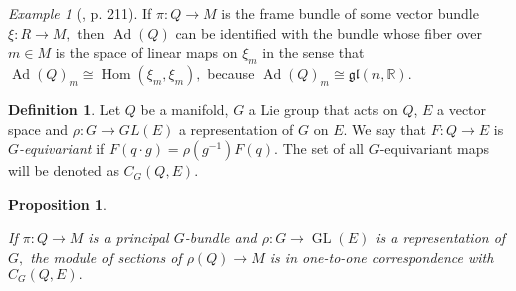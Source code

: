 \documentclass[12pt, letterpaper, reqno]{amsart}
\theoremstyle{definition}
\newtheorem{df}{Definition}
\theoremstyle{plain}
\newtheorem{prop}{Proposition}
\theoremstyle{remark}
\newtheorem{ex}{Example}
\begin{document}
\begin{ex}[\cite{montgomery2002tour}, p. 211]
	If $ \pi:Q \rightarrow M $ is the frame bundle of some vector bundle $ \xi: R \rightarrow M, $ then $ \operatorname{Ad}(Q) $ can be identified with the bundle whose fiber over $ m\in M $ is the space of linear maps on $ \xi_m $ in the sense that $ \operatorname{Ad} (Q)_m \cong \operatorname{Hom}(\xi_m,\xi_m),  $ because $ \operatorname{Ad}(Q)_m\cong \mathfrak{gl}(n, \mathbb{R}).  $ 
\end{ex}
\begin{df}\label{df:equivariant}
	Let $ Q $ be a manifold, $ G $ a Lie group that acts on $ Q $, $ E $ a vector space and $ \rho: G \rightarrow GL(E) $ a representation of $ G $ on $ E $. We say that $ F: Q \rightarrow E $ is \textit{$G$-equivariant} if $ F(q\cdot g) = \rho(g^{-1})F(q). $ The set of all $ G $-equivariant maps will be denoted as $ C_G(Q,E). $  
\end{df}
\begin{prop}\label{prop:equiv_section_equivariant}

If $ \pi: Q \rightarrow M $ is a principal $ G $-bundle and $ \rho: G \rightarrow \operatorname{GL} (E) $ is a representation  of $ G, $ the module of sections of $ \rho(Q) \rightarrow M $ is in one-to-one correspondence with $ C_G(Q,E). $
\end{prop}
\end{document}
